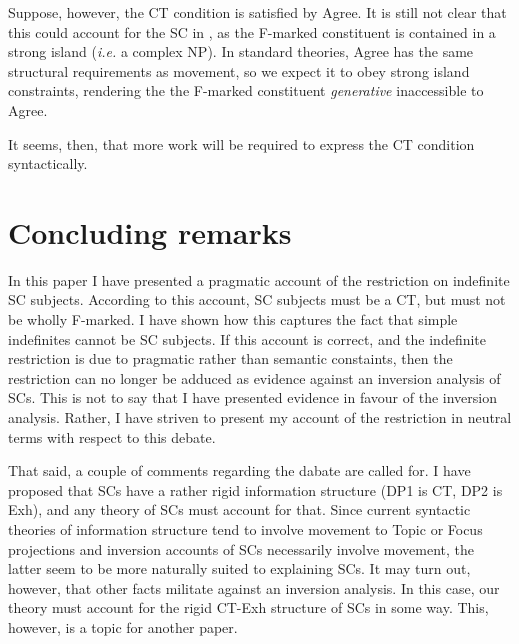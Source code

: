 \documentclass[letterpaper]{article}
\begin{document}
Suppose, however, the CT condition is satisfied by Agree.
It is still not clear that this could account for the SC in \LLast, as the F-marked constituent is contained in a strong island (\textit{i.e.} a complex NP).
In standard theories, Agree has the same structural requirements as movement, so we expect it to obey strong island constraints, rendering the the F-marked constituent \textit{generative} inaccessible to Agree.

It seems, then, that more work will be required to express the CT condition syntactically.


%
%
\section{Concluding remarks}\label{sec:Conclusion}
In this paper I have presented a pragmatic account of the restriction on indefinite SC subjects.
According to this account, SC subjects must be a CT, but must not be wholly F-marked.
I have shown how this captures the fact that simple indefinites cannot be SC subjects.
If this account is correct, and the indefinite restriction is due to pragmatic rather than semantic constaints, then  the restriction can no longer be adduced as evidence against an inversion analysis of SCs. 
This is not to say that I have presented evidence in favour of the inversion analysis.
Rather, I have striven to present my account of the restriction in neutral terms with respect to this debate.

That said, a couple of comments regarding the dabate are called for.
I have proposed that SCs have a rather rigid information structure (DP1 is CT, DP2 is Exh), and any theory of SCs must account for that.
Since current syntactic theories of information structure tend to involve movement to Topic or Focus projections and inversion accounts of SCs necessarily involve movement, the latter seem to be more naturally suited to explaining SCs.
It may turn out, however, that other facts militate against an inversion analysis.
In this case, our theory must account for the rigid CT-Exh structure of SCs in some way.
This, however, is a topic for another paper.
\end{document}
